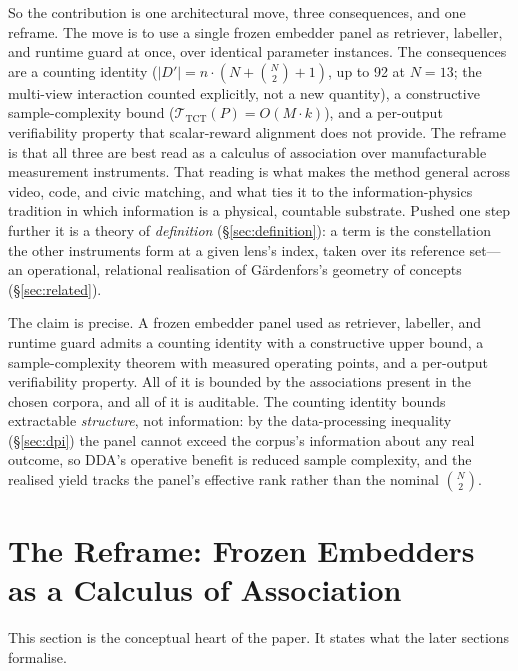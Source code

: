 \documentclass[10pt,twocolumn]{article}
\begin{document}
So the contribution is one architectural move, three consequences, and one
reframe. The move is to use a single frozen embedder panel as retriever,
labeller, and runtime guard at once, over identical parameter instances. The
consequences are a counting identity ($|D'| = n\cdot(N+\binom{N}{2}+1)$, up to 92
at $N=13$; the multi-view interaction counted explicitly, not a new quantity), a
constructive sample-complexity bound
($\mathcal{T}_{\mathrm{TCT}}(P)=O(M\cdot k)$), and a per-output verifiability
property that scalar-reward alignment does not provide. The reframe is that all
three are best read as a calculus of association over manufacturable measurement
instruments. That reading is what makes the method general across video, code,
and civic matching, and what ties it to the information-physics tradition in
which information is a physical, countable substrate. Pushed one step further it
is a theory of \emph{definition} (\S\ref{sec:definition}): a term is the
constellation the other instruments form at a given lens's index, taken over its
reference set---an operational, relational realisation of G\"ardenfors's geometry
of concepts (\S\ref{sec:related}).

The claim is precise. A frozen embedder panel used as retriever, labeller, and
runtime guard admits a counting identity with a constructive upper bound, a
sample-complexity theorem with measured operating points, and a per-output
verifiability property. All of it is bounded by the associations present in the
chosen corpora, and all of it is auditable. The counting identity bounds
extractable \emph{structure}, not information: by the data-processing inequality
(\S\ref{sec:dpi}) the panel cannot exceed the corpus's information about any real
outcome, so DDA's operative benefit is reduced sample complexity, and the realised
yield tracks the panel's effective rank rather than the nominal $\binom{N}{2}$.

\section{The Reframe: Frozen Embedders as a Calculus of Association}
\label{sec:reframe}
This section is the conceptual heart of the paper. It states what the later
sections formalise.
\end{document}
